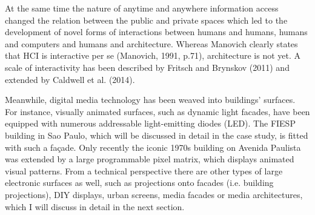 At the same time the nature of anytime and anywhere information access changed the relation between the public and private spaces which led to the development of novel forms of interactions between humans and humans, humans and computers and humans and architecture. Whereas Manovich clearly states that HCI is interactive per se (Manovich, 1991, p.71), architecture is not yet. A scale of interactivity has been described by Fritsch and Brynskov (2011) and extended by Caldwell et al. (2014).


Meanwhile, digital media technology has been weaved into buildings’ surfaces. 
For instance, visually animated surfaces, such as dynamic light facades, have been equipped with numerous addressable light-emitting diodes (LED). The FIESP building in Sao Paulo, which will be discussed in detail in the case study, is fitted with such a façade. 
Only recently the iconic 1970s building on Avenida Paulista was extended by a large programmable pixel matrix, which displays animated visual patterns. 
From a technical perspective there are other types of large electronic surfaces as well, such as projections onto facades (i.e. building projections), DIY displays, urban screens, media facades or media architectures, which I will discuss in detail in the next section.



